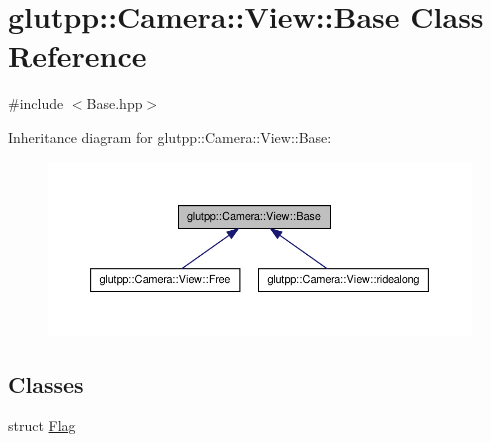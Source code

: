 \hypertarget{classglutpp_1_1Camera_1_1View_1_1Base}{\section{glutpp\-:\-:\-Camera\-:\-:\-View\-:\-:\-Base \-Class \-Reference}
\label{classglutpp_1_1Camera_1_1View_1_1Base}
}


 




{\ttfamily \#include $<$\-Base.\-hpp$>$}



\-Inheritance diagram for glutpp\-:\-:\-Camera\-:\-:\-View\-:\-:\-Base\-:\nopagebreak
\begin{figure}[H]
\begin{center}
\leavevmode
\includegraphics[width=350pt]{classglutpp_1_1Camera_1_1View_1_1Base__inherit__graph}
\end{center}
\end{figure}
\subsection*{\-Classes}
\begin{DoxyCompactItemize}
\item 
struct \hyperlink{structglutpp_1_1Camera_1_1View_1_1Base_1_1Flag}{\-Flag}
\end{DoxyCompactItemize}
